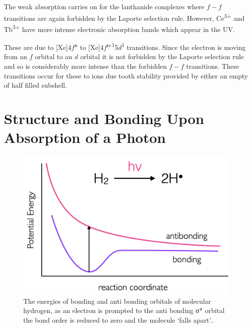 \documentclass[
]{book}
\begin{document}
The weak absorption carries on for the lanthanide complexes where \(f-f\) transitions are again forbidden by the Laporte selection rule. However, Ce\textsuperscript{3+} and Tb\textsuperscript{3+} have more intense electronic absorption bands which appear in the UV.

These are due to {[}Xe{]}4\(f\)\textsuperscript{n} to {[}Xe{]}4\(f\)\textsuperscript{n-1}5\(d\)\textsuperscript{1} transitions. Since the electron is moving from an \(f\) orbital to an \(d\) orbital it is not forbidden by the Laporte selection rule and so is considerably more intense than the forbidden \(f-f\) transitions. These transitions occur for these to ions due tooth stability provided by either an empty of half filled subshell.

\hypertarget{sec:structureonabs}{%
\section{Structure and Bonding Upon Absorption of a Photon}\label{sec:structureonabs}}

\begin{figure}

{\centering \includegraphics[width=0.6\linewidth]{images/Hbondingen} 

}

\caption{The energies of  bonding and anti bonding orbitals of molecular hydrogen, as an electron is prompted to the anti bonding σ* orbital the bond order is reduced to zero and the molecule ‘falls apart’..}\label{fig:Hbondingen}
\end{figure}
\end{document}
